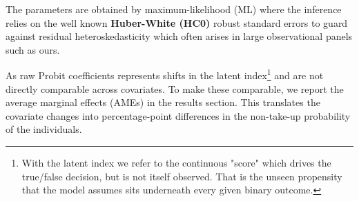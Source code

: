 The parameters are obtained by maximum-likelihood (ML) where the inference relies on the well known \textbf{Huber-White (HC0)} robust standard errors to guard against residual heteroskedasticity which often arises in large observational panels such as ours.

As raw Probit coefficients represents shifts in the latent index\footnote{
With the latent index we refer to the continuous "score" which drives the true/false decision, but is not itself observed. That is the unseen propensity that the model assumes sits underneath every given binary outcome.
}
and are not directly comparable across covariates. To make these comparable, we report the average marginal effects (AMEs) in the results section. This translates the covariate changes into percentage-point differences in the non-take-up probability of the individuals.


